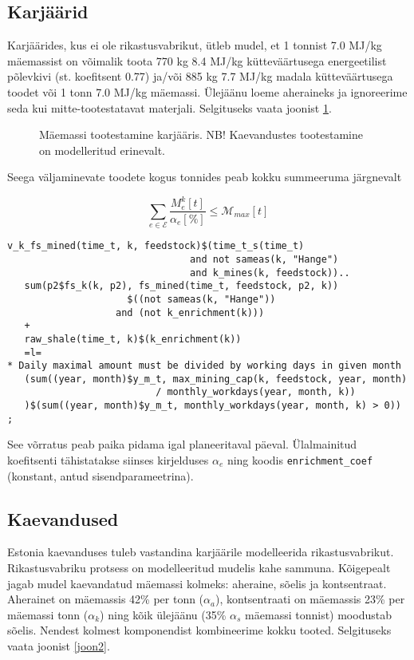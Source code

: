 \documentclass[10pt,a4paper]{article}
\begin{document}
\subsection{Karjäärid}
Karjäärides, kus ei ole rikastusvabrikut, ütleb mudel, et 1 tonnist 7.0 MJ/kg mäemassist on võimalik toota 770 kg 8.4 MJ/kg kütteväärtusega energeetilist põlevkivi (st. koefitsent 0.77) ja/või 885 kg 7.7 MJ/kg madala kütteväärtusega toodet või 1 tonn 7.0 MJ/kg mäemassi. Ülejäänu loeme aheraineks ja ignoreerime seda kui mitte-tootestatavat materjali. Selgituseks vaata joonist \ref{joon1}.

\begin{figure}

\caption{Mäemassi tootestamine karjääris. NB! Kaevandustes tootestamine on modelleritud erinevalt.
\label{joon1}}
\end{figure}

Seega väljaminevate toodete kogus tonnides peab kokku summeeruma järgne\-valt

\begin{equation}
\sum_{e \in \mathcal{E}} \frac{M^k_{e} [t]}{\mathit{\alpha}_e [\%]} \le \mathcal{M}_{max} [t]
\end{equation}

\begin{verbatim}
v_k_fs_mined(time_t, k, feedstock)$(time_t_s(time_t)
                                and not sameas(k, "Hange")
                                and k_mines(k, feedstock))..
   sum(p2$fs_k(k, p2), fs_mined(time_t, feedstock, p2, k))
                     $((not sameas(k, "Hange")) 
                   and (not k_enrichment(k)))
   +
   raw_shale(time_t, k)$(k_enrichment(k))
   =l=
* Daily maximal amount must be divided by working days in given month
   (sum((year, month)$y_m_t, max_mining_cap(k, feedstock, year, month)
                          / monthly_workdays(year, month, k))
   )$(sum((year, month)$y_m_t, monthly_workdays(year, month, k) > 0))
;
\end{verbatim}

See võrratus peab paika pidama igal planeeritaval päeval. Ülalmainitud koefitsenti tähistatakse siinses kirjelduses $\mathit{\alpha}_e$ ning koodis \texttt{enrichment\_coef} (konstant, antud sisendparameetrina).

\subsection{Kaevandused}
Estonia kaevanduses tuleb vastandina karjäärile modelleerida rikastusvabrikut. Rikastusvabriku protsess on modelleeritud mudelis kahe sammuna. Kõigepealt jagab mudel kaevandatud mäemassi kolmeks: aheraine, sõelis ja kontsentraat. Aherainet on mäemassis 42\% per tonn ($\mathit{\alpha_a}$), kontsentraati on mäemassis 23\% per mäemassi tonn ($\mathit{\alpha_k}$) ning kõik ülejäänu (35\% $\mathit{\alpha_s}$ mäemassi tonnist) moodustab sõelis. Nendest kolmest komponendist kombineerime kokku tooted. Selgituseks vaata joonist \ref{joon2}.
\end{document}
